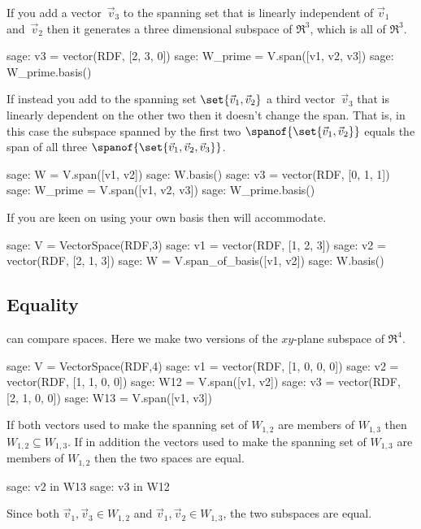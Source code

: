 If you add a vector~$\vec{v}_3$ to the spanning set that is linearly
independent of $\vec{v}_1$ and~$\vec{v}_2$ 
then it generates a three dimensional subspace of $\Re^3$, 
which is all of $\Re^3$.
\begin{sagecommandline}
sage: v3 = vector(RDF, [2, 3, 0])
sage: W_prime = V.span([v1, v2, v3])
sage: W_prime.basis()
\end{sagecommandline}
If instead you add to the spanning set $\set{\vec{v}_1,\vec{v}_2}$ 
a third vector~$\vec{v}_3$ 
that is linearly dependent on the other two then
it doesn't change the span.
That is, in this case the subspace spanned by the first two
$\spanof{\set{\vec{v}_1,\vec{v}_2}}$
equals the span of all three
$\spanof{\set{\vec{v}_1,\vec{v}_2,\vec{v}_3}}$.
\begin{sagecommandline}
sage: W = V.span([v1, v2])       
sage: W.basis()
sage: v3 = vector(RDF, [0, 1, 1])
sage: W_prime = V.span([v1, v2, v3])
sage: W_prime.basis()
\end{sagecommandline}

If you are keen on using your own basis then \Sage{} will
accommodate.
\begin{sagecommandline}
sage: V = VectorSpace(RDF,3)
sage: v1 = vector(RDF, [1, 2, 3])
sage: v2 = vector(RDF, [2, 1, 3])
sage: W = V.span_of_basis([v1, v2])
sage: W.basis()
\end{sagecommandline}




\subsection{Equality}

\Sage{} can compare spaces.
Here we make two versions of the $xy$-plane subspace of $\Re^4$.
\begin{sagecommandline}
sage: V = VectorSpace(RDF,4)
sage: v1 = vector(RDF, [1, 0, 0, 0])
sage: v2 = vector(RDF, [1, 1, 0, 0])
sage: W12 = V.span([v1, v2])
sage: v3 = vector(RDF, [2, 1, 0, 0])
sage: W13 = V.span([v1, v3])  
\end{sagecommandline}
If both vectors used to make the spanning set of $W_{1,2}$ are 
members of  $W_{1,3}$ then  $W_{1,2}\subseteq W_{1,3}$.
If in addition the vectors used to make the spanning set of  $W_{1,3}$ are 
members of  $W_{1,2}$ then the two spaces are equal.
\begin{sagecommandline}
sage: v2 in W13
sage: v3 in W12
\end{sagecommandline}
Since both $\vec{v}_1,\vec{v}_3\in W_{1,2}$ and 
$\vec{v}_1,\vec{v}_2\in W_{1,3}$, the two subspaces are equal.

